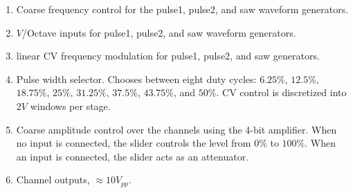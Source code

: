 \documentclass[12pt,a4paper]{article}
\begin{document}
\begin{enumerate}
  \item Coarse frequency control for the pulse1, pulse2, and saw waveform generators.
  \item $V$/Octave inputs for pulse1, pulse2, and saw waveform generators.
  \item linear CV frequency modulation for pulse1, pulse2, and saw generators.
  \item Pulse width selector. Chooses between eight duty cycles: $6.25\%$, $12.5\%$, $18.75\%$, $25\%$, $31.25\%$, $37.5\%$, $43.75\%$, and $50\%$. CV control is discretized into $2V$ windows per stage.
  \item Coarse amplitude control over the channels using the 4-bit amplifier. When no input is connected, the slider controls the level from $0\%$ to $100\%$. When an input is connected, the slider acts as an attenuator.
  \item Channel outputs, ${\approx}10V_{pp}$.
\end{enumerate}


\clearpage
\renewcommand\refname{References \& Acknowledgments}
\nocite{*}


\end{document}

